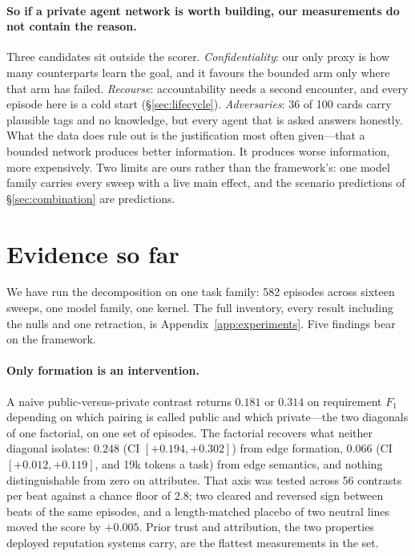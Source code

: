 \paragraph{So if a private agent network is worth building, our measurements do not contain
the reason.} Three candidates sit outside the scorer. \emph{Confidentiality}: our only proxy
is how many counterparts learn the goal, and it favours the bounded arm only where that arm
has failed. \emph{Recourse}: accountability needs a second encounter, and every episode here
is a cold start (\S\ref{sec:lifecycle}). \emph{Adversaries}: 36 of 100 cards carry plausible
tags and no knowledge, but every agent that is asked answers honestly. What the data does
rule out is the justification most often given---that a bounded network produces better
information. It produces worse information, more expensively. Two limits are ours rather
than the framework's: one model family carries every sweep with a live main effect, and the
scenario predictions of \S\ref{sec:combination} are predictions.
\else
\section{Evidence so far}
\label{sec:evidence}

We have run the decomposition on one task family: 582 episodes across sixteen sweeps, one
model family, one kernel. The full inventory, every result including the nulls and one
retraction, is Appendix~\ref{app:experiments}. Five findings bear on the framework.

\paragraph{Only formation is an intervention.} A naive public-versus-private contrast
returns $0.181$ or $0.314$ on requirement $F_1$ depending on which pairing is called public
and which private---the two diagonals of one factorial, on one set of episodes. The
factorial recovers what neither diagonal isolates: $0.248$ (CI $[+0.194, +0.302]$) from edge
formation, $0.066$ (CI $[+0.012, +0.119]$, and 19k tokens a task) from edge semantics, and
nothing distinguishable from zero on attributes. That axis was tested across 56 contrasts
per beat against a chance floor of $2.8$; two cleared and reversed sign between beats of the
same episodes, and a length-matched placebo of two neutral lines moved the score by
$+0.005$. Prior trust and attribution, the two properties deployed reputation systems carry,
are the flattest measurements in the set.

